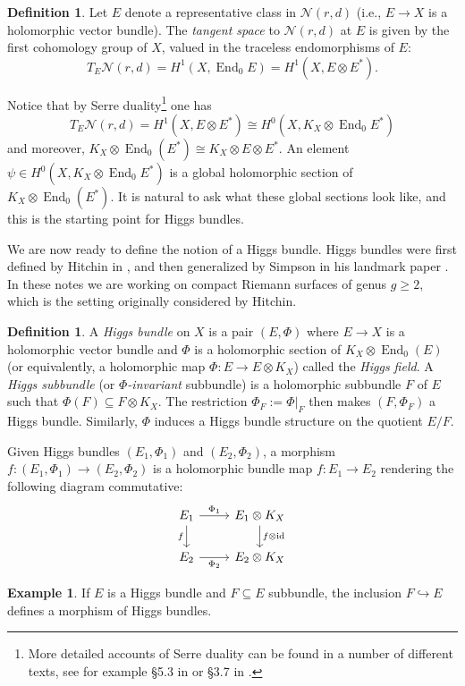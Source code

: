 \documentclass[10pt]{amsart}
\numberwithin{equation}{section}
\def\~#1{\mathscr{#1}}
\newcommand{\mono}{\hookrightarrow}
\newcommand{\id}{\mathrm{id}}
\DeclareMathOperator{\End}{End}
\theoremstyle{plain}
\theoremstyle{definition}
\newtheorem{defn}[thm]{Definition}
\newtheorem{ex}[thm]{Example}
\theoremstyle{remark}
\begin{document}
\begin{defn}
    Let $E$ denote a representative class in $\~N (r, d)$ (i.e., $E \to X$ is a holomorphic vector bundle). The \emph{tangent space} to $\~N(r, d)$ at $E$ is given by the first cohomology group of $X$, valued in the traceless endomorphisms of $E$:
    \begin{equation} 
        T_E\~N(r, d) = H^1 \left(X, \End_0 E \right) = H^1 \left(X, E \otimes E^*\right).
    \end{equation}
\end{defn}

Notice that by Serre duality\footnote{More detailed accounts of Serre duality can be found in a number of different texts, see for example \S 5.3 in \cite{miranda} or \S 3.7 in \cite{hartshorne}.} one has
\begin{equation}
    T_E \~N(r, d) = H^1 \left(X, E \otimes E^*\right) \cong H^0(X, K_X \otimes \End_0E^*)
\end{equation}
and moreover, $K_X \otimes \End_0(E^*) \cong K_X \otimes E \otimes E^*$. An element $\psi \in H^0(X, K_X \otimes \End_0E^*)$ is a global holomorphic section of $K_X \otimes \End_0 (E^*)$. It is natural to ask what these global sections look like, and this is the starting point for Higgs bundles.

We are now ready to define the notion of a Higgs bundle. Higgs bundles were first defined by Hitchin in \cite{hitchin1987A}, and then generalized by Simpson in his landmark paper \cite{simpson92}. In these notes we are working on compact Riemann surfaces of genus $g \ge 2$, which is the setting originally considered by Hitchin. 
\begin{defn}
    A \emph{Higgs bundle} on $X$ is a pair $(E, \Phi)$ where $E \to X$ is a holomorphic vector bundle and $\Phi$ is a holomorphic section of $K_X \otimes \End_0(E)$ (or equivalently, a holomorphic map $\Phi: E \to E \otimes K_X$) called the \emph{Higgs field}. A \emph{Higgs subbundle} (or \emph{$\Phi$-invariant} subbundle) is a holomorphic subbundle $F$ of $E$ such that $\Phi(F) \subseteq F \otimes K_X$. The restriction $\Phi_F := \Phi|_F$ then makes $(F, \Phi_F)$ a Higgs bundle. Similarly, $\Phi$ induces a Higgs bundle structure on the quotient $E/F$.
\end{defn}
Given Higgs bundles $(E_1, \Phi_1)$ and $(E_2, \Phi_2)$, a morphism $f: (E_1, \Phi_1) \to (E_2, \Phi_2)$ is a holomorphic bundle map $f: E_1 \to E_2$ rendering the following diagram commutative:
\begin{equation}\label{eq:1.5}
\begin{tikzcd}
    {E_1} & {E_1 \otimes K_X} \\
    {E_2} & {E_2 \otimes K_X}
    \arrow["{\Phi_1}", from=1-1, to=1-2]
    \arrow["f"', from=1-1, to=2-1]
    \arrow["{f \otimes \id}", from=1-2, to=2-2]
    \arrow["{\Phi_2}"', from=2-1, to=2-2]
\end{tikzcd}
\end{equation}
\begin{ex}
    If $E$ is a Higgs bundle and $F \subseteq E$ subbundle, the inclusion $F \mono E$ defines a morphism of Higgs bundles.
\end{ex}
\end{document}
